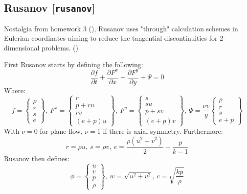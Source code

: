 \documentclass[a4paper, 12pt]{article}
\begin{document}
\subsection{Rusanov [\texttt{rusanov}]}
Nostalgia from homework 3 (\cite{hw3}), Rusanov uses "through" calculation schemes in Eulerian coordinates aiming to reduce the tangential discontinuities for 2-dimensional problems. (\cite{rusanov})\par
First Rusanov starts by defining the following:
\begin{equation}
    \dfrac{\partial f}{\partial t}+\dfrac{\partial F^x}{\partial x}+\dfrac{\partial F^y}{\partial y}+ \Psi = 0
\end{equation}
Where:
\begin{equation}
    f=\begin{Bmatrix}
        \rho\\r\\s\\e
    \end{Bmatrix},\:
    F^x=\begin{Bmatrix}
        r\\p+ru\\rv\\(e+p)u
    \end{Bmatrix},\:
    F^y=\begin{Bmatrix}
        s\\su\\p+sv\\(e+p)v
    \end{Bmatrix},\:
    \Psi=\dfrac{\nu v}{y}\begin{Bmatrix}
        \rho\\r\\s\\e+p
    \end{Bmatrix}
\end{equation}
With $\nu = 0$ for plane flow, $\nu = 1$ if there is axial symmetry. Furthermore:
\begin{equation}
    r = \rho u,\: s= \rho v,\: e=\dfrac{\rho(u^2+v^2)}{2}+\dfrac{p}{k-1}
\end{equation}
Rusanov then defines:
\begin{equation}
    \phi = \begin{Bmatrix}
        u\\v\\p\\\rho
    \end{Bmatrix},\: w=\sqrt{u^2+v^2},\: c=\sqrt{\dfrac{kp}{\rho}}
\end{equation}
\end{document}

